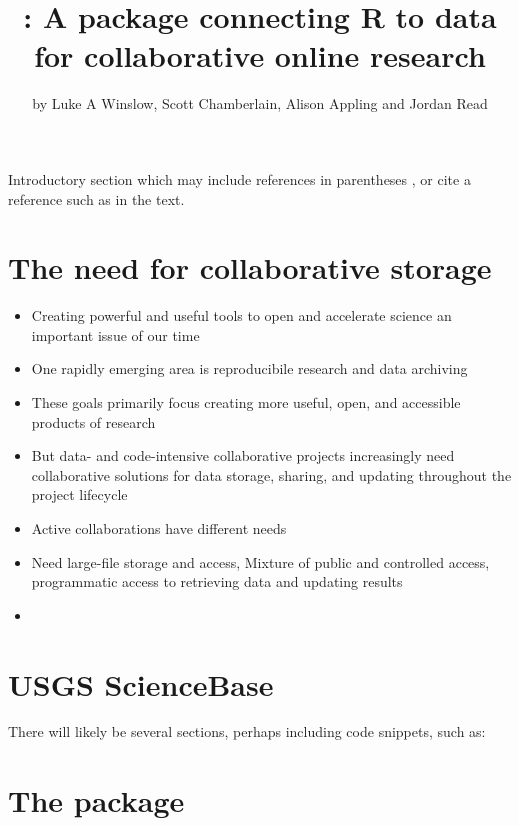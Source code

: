 \title{: A package connecting R to data for collaborative online research}
\author{by Luke A Winslow, Scott Chamberlain, Alison Appling and Jordan Read}

\maketitle


Introductory section which may include references in parentheses
\citep{R}, or cite a reference such as \citet{R} in the text.

\section{The need for collaborative storage}

\begin{itemize}
	\item{Creating powerful and useful tools to open and accelerate science an important issue of our time}
	\item{One rapidly emerging area is reproducibile research and data archiving}
	\item{These goals primarily focus creating more useful, open, and accessible products of research}
	\item{But data- and code-intensive collaborative projects increasingly need collaborative solutions for data storage, sharing, and updating throughout the project lifecycle}
\end{itemize}
\begin{itemize}
	\item{Active collaborations have different needs}
	\item{Need large-file storage and access, Mixture of public and controlled access, programmatic access to retrieving data and updating results}
	\item{}
	
\end{itemize}


\section{USGS ScienceBase}

There will likely be several sections, perhaps including code snippets, such as:

\section{The  package}



